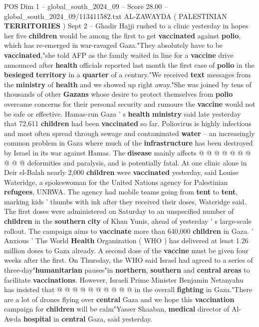 \begin{textsample}{POS Dim 1 – global\_south\_2024\_09 – Score 28.00 – global\_south\_2024\_09/113411582.txt}  \label{ex:f1_pos_205}
AL-ZAWAYDA ( PALESTINIAN \textbf{TERRITORIES} ) Sept 2 -- Ghadir Hajji rushed to a clinic yesterday in hopes her five \textbf{children} would be among the first to get \textbf{vaccinated} against \textbf{polio}, which has re-emerged in war-ravaged Gaza."They absolutely have to be \textbf{vaccinated},"she told AFP as the family waited in line for a \textbf{vaccine} drive announced after \textbf{health} officials reported last month the first case of \textbf{polio} in the \textbf{besieged} \textbf{territory} in a \textbf{quarter} of a century."We received \textbf{text} messages from the \textbf{ministry} of \textbf{health} and we showed up right away."She was joined by tens of thousands of other \textbf{Gazans} whose desire to protect themselves from \textbf{polio} overcame concerns for their personal security and rumours the \textbf{vaccine} would not be safe or effective.
Hamas-run Gaza ' s \textbf{health} \textbf{ministry} said late yesterday that 72,611 \textbf{children} had been \textbf{vaccinated} so far.
Poliovirus is highly infectious and most often spread through sewage and contaminated \textbf{water} -- an increasingly common problem in Gaza where much of the \textbf{infrastructure} has been destroyed by Israel in its war against Hamas.
The \textbf{disease} mainly affects @ @ @ @ @ @ @ @ @ @ deformities and paralysis, and is potentially fatal.
At one clinic alone in Deir el-Balah nearly 2,000 \textbf{children} were \textbf{vaccinated} yesterday, said Louise Wateridge, a spokeswoman for the United Nations agency for Palestinian \textbf{refugees}, UNRWA.
The agency had mobile teams going from \textbf{tent} to \textbf{tent}, marking kids ' thumbs with ink after they received their doses, Wateridge said.
The first doses were administered on Saturday to an unspecified number of \textbf{children} in the \textbf{southern} \textbf{city} of Khan Yunis, ahead of yesterday ' s large-scale rollout.
The campaign aims to \textbf{vaccinate} more than 640,000 \textbf{children} in Gaza. ' Anxious ' The World \textbf{Health} Organization ( WHO ) has delivered at least 1.26 million doses to Gaza already.
A second dose of the \textbf{vaccine} must be given four weeks after the first.
On Thursday, the WHO said Israel had agreed to a series of three-day"\textbf{humanitarian} pauses"in \textbf{northern}, \textbf{southern} and \textbf{central} \textbf{areas} to facilitate \textbf{vaccinations}.
However, Israeli Prime Minister Benjamin Netanyahu has insisted that @ @ @ @ @ @ @ @ @ @ in the overall \textbf{fighting} in Gaza."There are a lot of drones flying over \textbf{central} Gaza and we hope this \textbf{vaccination} campaign for \textbf{children} will be calm"Yasser Shaaban, \textbf{medical} director of Al-Awda \textbf{hospital} in \textbf{central} Gaza, said yesterday.

\end{textsample}
